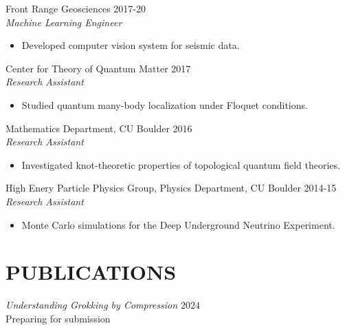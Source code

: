 \documentclass[margin]{res}
\begin{document}
\begin{resume}
               Front Range Geosciences \hfill            2017-20 \\
                 {\sl Machine Learning Engineer}
                 \begin{itemize}  \itemsep -2pt %
                 \item Developed computer vision system for seismic data.
                 \end{itemize}
                 Center for Theory of Quantum Matter \hfill            2017 \\
		{\sl Research Assistant}
                 \begin{itemize}  \itemsep -2pt %
                 \item Studied quantum many-body localization under Floquet conditions.
                 \end{itemize}

                Mathematics Department, CU Boulder \hfill            2016 \\
		 {\sl Research Assistant}
                 \begin{itemize}  \itemsep -2pt %
                 \item Investigated knot-theoretic properties of topological quantum field theories.
                 \end{itemize}

                High Enery Particle Physics Group, Physics Department, CU Boulder  \hfill            2014-15 \\
		{\sl Research Assistant}
                 \begin{itemize}  \itemsep -2pt %
                 \item Monte Carlo simulations for the Deep Underground Neutrino Experiment.
                 \end{itemize}

                 \section{PUBLICATIONS}

                 {\sl Understanding Grokking by Compression \hfill $2024$}\\
                 Preparing for submission


\end{resume}
\end{document}
